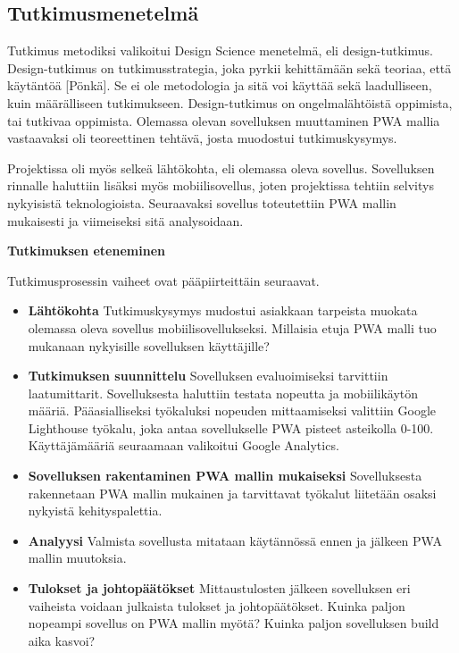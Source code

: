 \documentclass{tktltiki}
\begin{document}
\subsection{Tutkimusmenetelmä}

Tutkimus metodiksi valikoitui Design Science menetelmä, eli design-tutkimus. Design-tutkimus on tutkimusstrategia, joka pyrkii kehittämään sekä teoriaa, että käytäntöä [Pönkä]. Se ei ole metodologia ja sitä voi käyttää sekä laadulliseen, kuin määrälliseen tutkimukseen. Design-tutkimus on ongelmalähtöistä oppimista, tai tutkivaa oppimista. Olemassa olevan sovelluksen muuttaminen PWA mallia vastaavaksi oli teoreettinen tehtävä, josta muodostui tutkimuskysymys. 

Projektissa oli myös selkeä lähtökohta, eli olemassa oleva sovellus. Sovelluksen rinnalle haluttiin lisäksi myös mobiilisovellus, joten projektissa tehtiin selvitys nykyisistä teknologioista. Seuraavaksi sovellus toteutettiin PWA mallin mukaisesti ja viimeiseksi sitä analysoidaan.

\textbf{Tutkimuksen eteneminen}

Tutkimusprosessin vaiheet ovat pääpiirteittäin seuraavat.

\begin{itemize}
  \item \textbf{Lähtökohta} Tutkimuskysymys mudostui asiakkaan tarpeista muokata olemassa oleva sovellus mobiilisovellukseksi. Millaisia etuja PWA malli tuo mukanaan nykyisille sovelluksen käyttäjille?
  \item \textbf{Tutkimuksen suunnittelu} Sovelluksen evaluoimiseksi tarvittiin laatumittarit. Sovelluksesta haluttiin testata nopeutta ja mobiilikäytön määriä. Pääasialliseksi työkaluksi nopeuden mittaamiseksi valittiin Google Lighthouse työkalu, joka antaa sovellukselle PWA pisteet asteikolla 0-100. Käyttäjämääriä seuraamaan valikoitui Google Analytics.
  \item \textbf{Sovelluksen rakentaminen PWA mallin mukaiseksi} Sovelluksesta rakennetaan PWA mallin mukainen ja tarvittavat työkalut liitetään osaksi nykyistä kehityspalettia.
  \item \textbf{Analyysi} Valmista sovellusta mitataan käytännössä ennen ja jälkeen PWA mallin muutoksia.
  \item \textbf{Tulokset ja johtopäätökset} Mittaustulosten jälkeen sovelluksen eri vaiheista voidaan julkaista tulokset ja johtopäätökset. Kuinka paljon nopeampi sovellus on PWA mallin myötä? Kuinka paljon sovelluksen build aika kasvoi?
\end{itemize}
\end{document}
